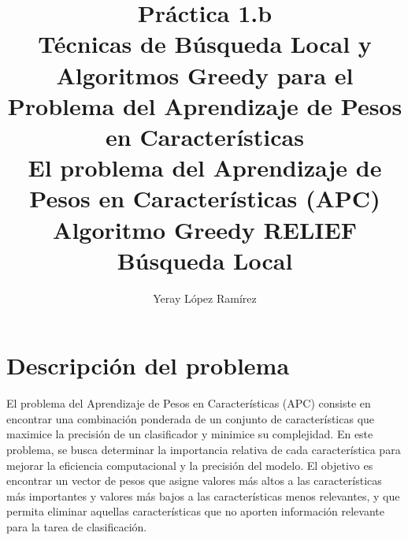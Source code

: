 

\title{
	Práctica 1.b \\\vspace{1cm}
	Técnicas de Búsqueda Local y Algoritmos Greedy
	para el Problema del Aprendizaje de Pesos en
	Características \vspace{1cm} \\
	El problema del Aprendizaje de Pesos en Características (APC)	\vspace{1cm} \\
	Algoritmo Greedy RELIEF \\
	Búsqueda Local \hspace{1cm} 
 }   

\author{Yeray López Ramírez	}                             

\renewcommand*\contentsname{hola}

\makeatletter
\let\thetitle\@title
\let\theauthor\@author
\let\thedate\@date
\makeatother





\newpage %
\newcommand{\code}[1]{\colorbox{light-gray}{\textcolor{alizarin}{\texttt{#1}}}}
\newcommand{\high}[1]{\colorbox{light-gray}{\textcolor{nyellow}{\texttt{#1}}}}

\tableofcontents %

\listoffigures

\listoftables

\newpage


\section{Descripción del problema}
El problema del Aprendizaje de Pesos en Características (APC) consiste en encontrar una combinación ponderada de un conjunto de características que maximice la precisión de un clasificador y minimice su complejidad. En este problema, se busca determinar la importancia relativa de cada característica para mejorar la eficiencia computacional y la precisión del modelo. El objetivo es encontrar un vector de pesos que asigne valores más altos a las características más importantes y valores más bajos a las características menos relevantes, y que permita eliminar aquellas características que no aporten información relevante para la tarea de clasificación. \\

